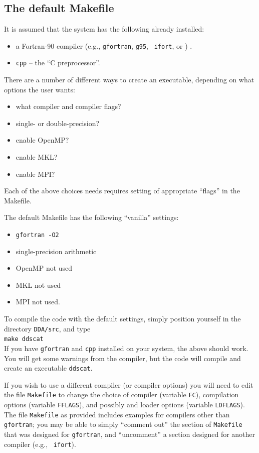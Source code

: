 \subsection{\label{sec:Makefile}
            The default Makefile}
It is assumed that the system has the following already installed:
\begin{itemize}
\item a Fortran-90 compiler (e.g., {\tt gfortran}, {\tt g95},
\Intel\ {\tt ifort}, or ) .
\item {\tt cpp} -- the ``C preprocessor''.
\end{itemize}
There are a number of different ways to create an executable, depending
on what options the user wants:
\begin{itemize}
\item what compiler and compiler flags?
\item single-  or double-precision?
\item enable OpenMP?
\item enable MKL?
\item enable MPI?
\end{itemize}
Each of the above choices needs requires setting of appropriate
``flags'' in the Makefile.

The default Makefile has the following ``vanilla'' settings:
\begin{itemize}
\item {\tt gfortran -O2}
\item single-precision arithmetic
\item OpenMP not used
\item MKL not used
\item MPI not used.
\end{itemize}
To compile the code with the default settings, simply
position yourself in the directory
{\tt DDA/src}, and type\\
 {\tt make ddscat}\\
If you have {\tt gfortran} and {\tt cpp} installed on your system,
the above should work. You will get some warnings from the compiler,
but the code will compile and create an executable {\tt ddscat}.

If you wish to use a different compiler
(or compiler options) you will need to edit the file {\tt Makefile}
to change the choice of compiler (variable {\tt FC}),
compilation options (variable {\tt FFLAGS}), and possibly
and loader options (variable {\tt LDFLAGS}).
The file {\tt Makefile} as provided includes examples for compilers other than
{\tt gfortran}; you may be able to simply ``comment out'' the section of
{\tt Makefile} that was designed for {\tt gfortran}, and ``uncomment''
a section designed for another compiler (e.g., \Intel\ {\tt ifort}).


